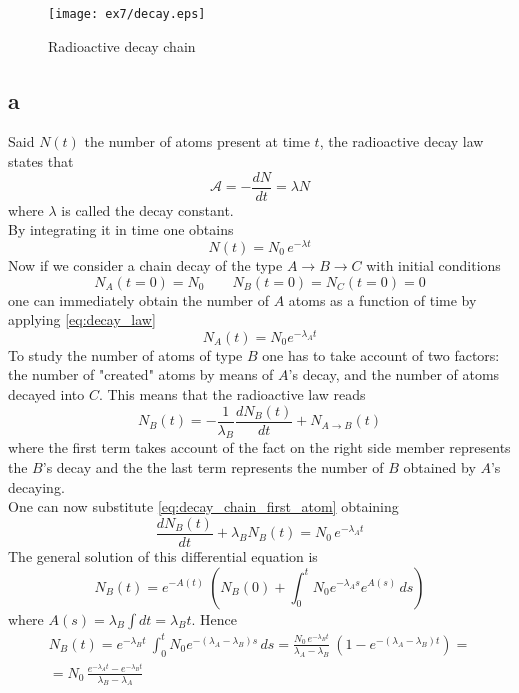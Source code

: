 \begin{figure}[htbp]
    \centering
    \texttt{[image: ex7/decay.eps]}
    \caption{Radioactive decay chain}
    \label{fig:decay_chain}
\end{figure}

\subsection*{a}
Said $N(t)$ the number of atoms present at time $t$, the radioactive decay law states that
\begin{equation}
    \mathcal{A} = -\frac{dN}{dt} = \lambda N
    \label{eq:decay_law}
\end{equation}
where $\lambda$ is called the decay constant. \\
By integrating it in time one obtains 
\begin{equation}
    N(t) = N_0 \, e^{-\lambda t}
    \label{eq:decay_chain_first_atom}
\end{equation}
Now if we consider a chain decay of the type $A \rightarrow B \rightarrow C$ with initial conditions 
\begin{equation*}
    N_A(t=0) = N_0 \qquad N_B(t=0) = N_C(t=0) = 0
\end{equation*}
one can immediately obtain the number of $A$ atoms as a function of time by applying \ref{eq:decay_law}
\begin{equation*}
    N_A(t) = N_0 e^{-\lambda_A t}
\end{equation*}
To study the number of atoms of type $B$ one has to take account of two factors: the number of "created" atoms by means of $A$'s decay, and
the number of atoms decayed into $C$. This means that the radioactive law reads 
\begin{equation*}
    N_B(t) = -\frac{1}{\lambda_B}\frac{dN_B(t)}{dt} + N_{A \to B}(t)
\end{equation*}
where the first term takes account of the fact on the right side member represents the $B$'s decay and the the last term 
represents the number of $B$ obtained by $A$'s decaying. \\
One can now substitute \ref{eq:decay_chain_first_atom} obtaining 
\begin{equation*}
    \frac{dN_B(t)}{dt} + \lambda_B N_B(t) =  N_0 \, e^{-\lambda_A t}
\end{equation*}
The general solution of this differential equation is 
\begin{equation*}
    N_B(t) = e^{-A(t)} \ \left(N_B(0) + \int_0^t N_0 e^{-\lambda_A s} e^{A(s)} \, ds \right)
\end{equation*}
where $A(s) = \lambda_B \int dt = \lambda_B t$. Hence
\begin{gather*}
N_B(t) = e^{-\lambda_B t} \ \int_0^t N_0 e^{-(\lambda_A - \lambda_B) s} \, ds 
= \frac{N_0 \, e^{-\lambda_B t}}{\lambda_A - \lambda_B} \ \left(1 - e^{-(\lambda_A - \lambda_B) t}\right) = \\
= N_0 \, \frac{e^{-\lambda_A t} - e^{-\lambda_B t}}{\lambda_B - \lambda_A}
\end{gather*}

